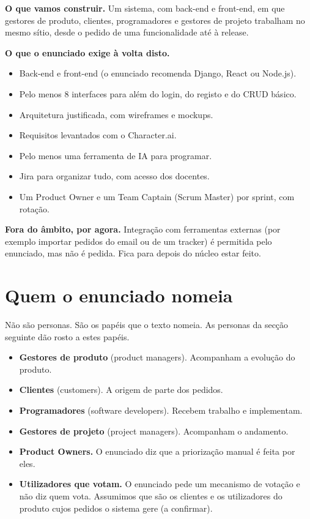 \documentclass[12pt,a4paper]{article}
\begin{document}
\textbf{O que vamos construir.} Um sistema, com back-end e front-end, em que gestores de produto, clientes, programadores e gestores de projeto trabalham no mesmo sítio, desde o pedido de uma funcionalidade até à release.

\textbf{O que o enunciado exige à volta disto.}
\begin{itemize}
\item Back-end e front-end (o enunciado recomenda Django, React ou Node.js).
\item Pelo menos 8 interfaces para além do login, do registo e do CRUD básico.
\item Arquitetura justificada, com wireframes e mockups.
\item Requisitos levantados com o Character.ai.
\item Pelo menos uma ferramenta de IA para programar.
\item Jira para organizar tudo, com acesso dos docentes.
\item Um Product Owner e um Team Captain (Scrum Master) por sprint, com rotação.
\end{itemize}

\textbf{Fora do âmbito, por agora.} Integração com ferramentas externas (por exemplo importar pedidos do email ou de um tracker) é permitida pelo enunciado, mas não é pedida. Fica para depois do núcleo estar feito.

\section{Quem o enunciado nomeia}

Não são personas. São os papéis que o texto nomeia. As personas da secção seguinte dão rosto a estes papéis.

\begin{itemize}
\item \textbf{Gestores de produto} (product managers). Acompanham a evolução do produto.
\item \textbf{Clientes} (customers). A origem de parte dos pedidos.
\item \textbf{Programadores} (software developers). Recebem trabalho e implementam.
\item \textbf{Gestores de projeto} (project managers). Acompanham o andamento.
\item \textbf{Product Owners.} O enunciado diz que a priorização manual é feita por eles.
\item \textbf{Utilizadores que votam.} O enunciado pede um mecanismo de votação e não diz quem vota. Assumimos que são os clientes e os utilizadores do produto cujos pedidos o sistema gere (a confirmar).
\end{itemize}
\end{document}
